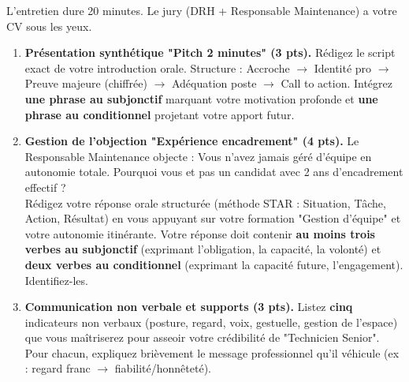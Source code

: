 \documentclass[11pt]{article}
\begin{document}
\begin{exercice}
L'entretien dure 20 minutes. Le jury (DRH + Responsable Maintenance) a votre CV sous les yeux.

\begin{enumerate}
    \item \textbf{Présentation synthétique "Pitch 2 minutes" (3 pts).} Rédigez le script exact de votre introduction orale. Structure : Accroche $\rightarrow$ Identité pro $\rightarrow$ Preuve majeure (chiffrée) $\rightarrow$ Adéquation poste $\rightarrow$ Call to action. Intégrez \textbf{une phrase au subjonctif} marquant votre motivation profonde et \textbf{une phrase au conditionnel} projetant votre apport futur.
    \item \textbf{Gestion de l'objection "Expérience encadrement" (4 pts).} Le Responsable Maintenance objecte : \og Vous n'avez jamais géré d'équipe en autonomie totale. Pourquoi vous et pas un candidat avec 2 ans d'encadrement effectif ? \fg\\
    Rédigez votre réponse orale structurée (méthode STAR : Situation, Tâche, Action, Résultat) en vous appuyant sur votre formation "Gestion d'équipe" et votre autonomie itinérante. Votre réponse doit contenir \textbf{au moins trois verbes au subjonctif} (exprimant l'obligation, la capacité, la volonté) et \textbf{deux verbes au conditionnel} (exprimant la capacité future, l'engagement). Identifiez-les.
    \item \textbf{Communication non verbale et supports (3 pts).} Listez \textbf{cinq} indicateurs non verbaux (posture, regard, voix, gestuelle, gestion de l'espace) que vous maîtriserez pour asseoir votre crédibilité de "Technicien Senior". Pour chacun, expliquez brièvement le message professionnel qu'il véhicule (ex : regard franc $\rightarrow$ fiabilité/honnêteté).
\end{enumerate}
\end{exercice}
\end{document}
